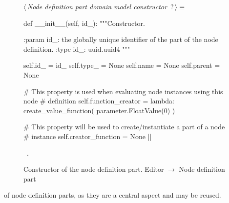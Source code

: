 \documentclass[%
    a4paper,    %
    justified,  %
    nobib,      %
    openany     %
]{tufte-book}
\begin{document}
\begin{figure}
\begin{flushleft} \small
\begin{minipage}{\linewidth}\label{scrap110}\raggedright\small
{} $\langle\,${\itshape Node definition part domain model constructor}\nobreak\ {\footnotesize {?}}$\,\rangle\equiv$
\vspace{-1ex}
\begin{pythoncode}
def __init__(self, id_):
    """Constructor.

    :param id_: the globally unique identifier of the part of the node
                definition.
    :type  id_: uuid.uuid4
    """

    self.id_    = id_
    self.type_  = None
    self.name   = None
    self.parent = None

    # This property is used when evaluating node instances using this node
    # definition
    self.function_creator = lambda: create_value_function(
        parameter.FloatValue(0)
    )

    # This property will be used to create/instantiate a part of a node
    # instance
    self.creator_function = None
    |\NWsep|
\end{pythoncode}
\vspace{1.5ex}
\footnotesize
\begin{list}{}{\setlength{\itemsep}{-\parsep}\setlength{\itemindent}{-\leftmargin}}
\item \NWtxtMacroRefIn\ .

\item{}
\end{list}
\end{minipage}\vspace{4ex}
\end{flushleft}
\caption{Constructor of the node definition part.
  \newline{}\newline{}Editor $\rightarrow$ Node definition part}
\label{editor:lst:node-definition-part:constructor}
\end{figure}

 of node definition parts, as
they are a central aspect and may be reused.
\end{document}
